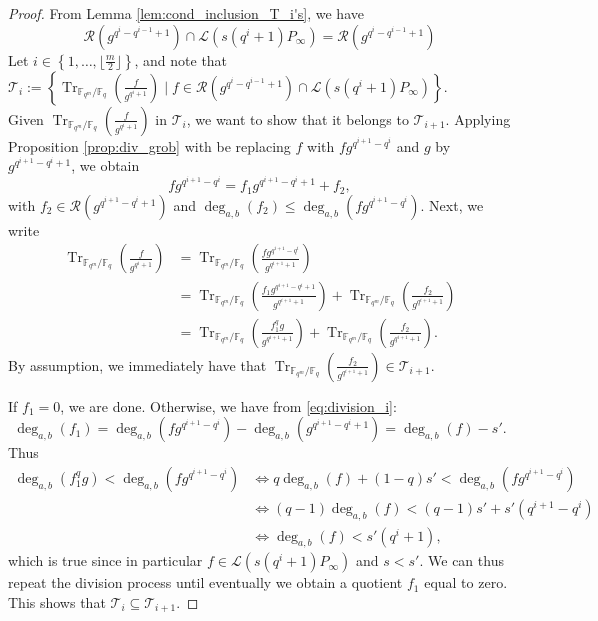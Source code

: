 \documentclass[a4paper]{article}
\theoremstyle{definition}
\theoremstyle{remark}
\newcommand{\calL}{\mathcal{L}}
\newcommand{\calR}{\mathcal{R}}
\newcommand{\calT}{\mathcal{T}}
\newcommand{\fq}{\mathbb{F}_{q}}
\newcommand{\Tr}[1]{\operatorname{Tr}_{\mathbb{F}_{q^m}/\fq}\left(#1\right)}
\newcommand{\set}[1]{\left\{#1\right\}}
\newcommand{\degab}[1]{\deg_{a,b}\left(#1\right)}
\begin{document}
\begin{proof}
From Lemma \ref{lem:cond_inclusion_T_i's}, we have
\begin{equation} \label{eq:equality_intersection}
  \calR(g^{q^{i}-q^{i-1}+1})\cap \calL(s(q^{i}+1)P_\infty) = \calR(g^{q^{i}-q^{i-1}+1}) 
\end{equation}
Let $i \in \set{1,\dots,\lfloor \frac{m}{2} \rfloor}$, and note that 
$\calT_i := \set{\Tr{\frac{f}{g^{q^i+1}}} \mid f \in \calR(g^{q^i-q^{i-1}+1})\cap \calL(s(q^i+1)P_\infty)}.$ \\
Given $\Tr{\frac{f}{g^{q^i+1}}}$ in $\calT_i$, we want to show that it belongs to $\calT_{i+1}$. Applying Proposition \ref{prop:div_grob} with be replacing $f$ with $fg^{q^{i+1}-q^i}$ and $g$ by $g^{q^{i+1}-q^i+1}$, we obtain
\begin{equation} \label{eq:division_i}
fg^{q^{i+1}-q^i} = f_1g^{q^{i+1}-q^i+1} + f_2,
\end{equation}
with $f_2 \in \calR(g^{q^{i+1}-q^i+1})$ and $\degab{f_2} \leq \degab{fg^{q^{i+1}-q^i}}$. Next, we write
\begin{align*}
    \Tr{\frac{f}{g^{q^i+1}}} &= \Tr{\frac{fg^{q^{i+1}-q^i}}{g^{q^{i+1}+1}}} \\
                             &= \Tr{\frac{f_1g^{q^{i+1}-q^i+1}}{g^{q^{i+1}+1}}} + \Tr{\frac{f_2}{g^{q^{i+1}+1}}} \\
                             &= \Tr{\frac{f_1^qg}{g^{q^{i+1}+1}}} + \Tr{\frac{f_2}{g^{q^{i+1}+1}}}.
\end{align*}
By assumption, we immediately have that $\Tr{\frac{f_2}{g^{q^{i+1}+1}}} \in \calT_{i+1}.$

If $f_1=0$, we are done. Otherwise, we have from \eqref{eq:division_i}:
$$\degab{f_1} = \degab{fg^{q^{i+1}-q^i}} - \degab{g^{q^{i+1}-q^i+1}} = \degab{f}-s'.$$
Thus
\begin{align*}
     \degab{f_1^qg} < \degab{fg^{q^{i+1}-q^i}} & \iff q\degab{f} +(1-q)s' < \degab{fg^{q^{i+1}-q^i}} \\
                                               & \iff (q-1)\degab{f} < (q-1)s' + s'(q^{i+1}-q^i) \\
                                               & \iff \degab{f} < s'(q^{i}+1),
\end{align*}
which is true since in particular $f \in \calL(s(q^i+1)P_\infty)$ and $s<s'$. We can thus repeat the division process until eventually we obtain a quotient $f_1$ equal to zero. This shows that $\calT_i \subseteq \calT_{i+1}$.


\end{proof}
\end{document}

